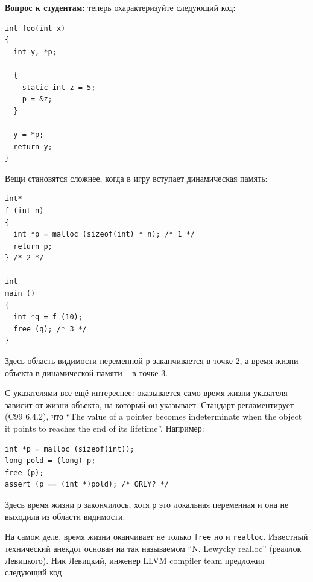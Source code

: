 \documentclass[a4paper,12pt,oneside]{article}
\newif\ifanswers
\begin{document}
\ifanswers
Правильный ответ: этот код демонстрирует undefined behavior. В точке разыменования указателя истекло время жизни того, на что он указывает.
\fi

\textbf{Вопрос к студентам:} теперь охарактеризуйте следующий код:

\begin{lstlisting}
int foo(int x) 
{
  int y, *p;

  {
    static int z = 5; 
    p = &z;
  }

  y = *p;
  return y;
}
\end{lstlisting}

\ifanswers
Правильный ответ: здесь работает ещё одна перегруженная функция ключевого слова \lstinline!static! -- оно расширяет время жизни переменной до времени жизни программы. Таким образом здесь будет все хорошо -- переменная \lstinline!z! будет жить даже между вызовами функции.
\fi

Вещи становятся сложнее, когда в игру вступает динамическая память:

\begin{lstlisting}
int* 
f (int n) 
{
  int *p = malloc (sizeof(int) * n); /* 1 */
  return p;
} /* 2 */

int 
main () 
{
  int *q = f (10); 
  free (q); /* 3 */
}
\end{lstlisting}

Здесь область видимости переменной \lstinline!p! заканчивается в точке 2, а время жизни объекта в динамической памяти -- в точке 3.

С указателями все ещё интереснее: оказывается само время жизни указателя зависит от жизни объекта, на который он указывает. Стандарт регламентирует (C99 6.4.2), что ``The value of a pointer becomes indeterminate when the object it points to reaches the end of its lifetime''. Например:

\begin{lstlisting}
int *p = malloc (sizeof(int));
long pold = (long) p;
free (p);
assert (p == (int *)pold); /* ORLY? */
\end{lstlisting}

Здесь время жизни \lstinline!p! закончилось, хотя \lstinline!p! это локальная переменная и она не выходила из области видимости.

На самом деле, время жизни оканчивает не только \lstinline!free! но и \lstinline!realloc!. Известный технический анекдот основан на так называемом ``N. Lewycky realloc'' (реаллок Левицкого). Ник Левицкий, инженер LLVM compiler team предложил следующий код
\end{document}
